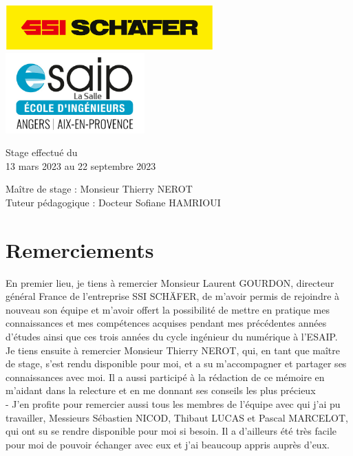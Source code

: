 \documentclass[a4paper, 12pt, french]{article}
\begin{document}
\begin{titlepage}
\begin{center}
			\vfill

			\includegraphics[width=0.6\textwidth]{images/schaefer.jpg}
			\vfill
			\includegraphics[width=0.4\textwidth]{images/esaip.jpg}

			\vfill

			Stage effectué du\\
			13 mars 2023 au 22 septembre 2023

			\vspace{0.8cm}
			
			\Large
			Maître de stage : Monsieur Thierry NEROT\\
			Tuteur pédagogique : Docteur Sofiane HAMRIOUI\\
		\end{center}
	\end{titlepage}
		
	\newpage

	\footnotesize
	\section*{Remerciements}		
		En premier lieu, je tiens à remercier Monsieur Laurent GOURDON, directeur général France de l'entreprise SSI SCHÄFER, de m’avoir permis de rejoindre à nouveau son équipe et m’avoir offert la possibilité de mettre en pratique mes connaissances et mes compétences acquises pendant mes précédentes années d’études ainsi que ces trois années du cycle ingénieur du numérique à l’ESAIP. \\

		Je tiens ensuite à remercier Monsieur Thierry NEROT, qui, en tant que maître de stage, s'est rendu disponible pour moi, et a su m'accompagner et partager ses connaissances avec moi. Il a aussi participé à la rédaction de ce mémoire en m'aidant dans la relecture et en me donnant ses conseils les plus précieux\\
-
		J’en profite pour remercier aussi tous les membres de l’équipe avec qui j’ai pu travailler, Messieurs Sébastien NICOD, Thibaut LUCAS et Pascal MARCELOT, qui ont su se rendre disponible pour moi si besoin. Il a d'ailleurs été très facile pour moi de pouvoir échanger avec eux et j'ai beaucoup appris auprès d'eux.\\
\end{document}
